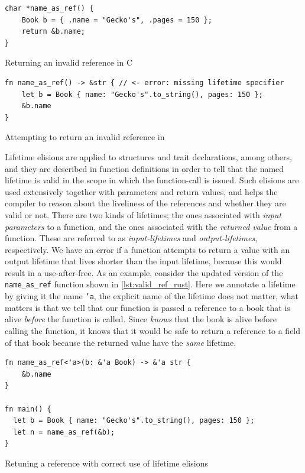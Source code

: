 \begin{listing}[tb]
\begin{verbatim}
char *name_as_ref() {
    Book b = { .name = "Gecko's", .pages = 150 };
    return &b.name;
}
\end{verbatim}
\caption{Returning an invalid reference in C}
\label{lst:invalid_ref_c}
\end{listing}

\begin{listing}[tb]
\begin{verbatim}
fn name_as_ref() -> &str { // <- error: missing lifetime specifier
    let b = Book { name: "Gecko's".to_string(), pages: 150 };
    &b.name
}
\end{verbatim}
\caption{Attempting to return an invalid reference in \rust}
\label{lst:invalid_ref_rust}
\end{listing}

Lifetime elisions are applied to structures and trait declarations, among others, and they are described in function definitions in order to tell \rust that the named lifetime is valid in the scope in which the function-call is issued.
Such elisions are used extensively together with parameters and return values, and helps the compiler to reason about the liveliness of the references and whether they are valid or not.
There are two kinds of lifetimes; the ones associated with \emph{input parameters} to a function, and the ones associated with the \emph{returned value} from a function.
These are referred to as \emph{input-lifetimes} and \emph{output-lifetimes}, respectively.
We have an error if a function attempts to return a value with an output lifetime that lives shorter than the input lifetime, because this would result in a use-after-free.
As an example, consider the updated version of the \texttt{name\_as\_ref} function shown in \autoref{lst:valid_ref_rust}.
Here we annotate a lifetime by giving it the name \texttt{'a}, the explicit name of the lifetime does not matter, what matters is that we tell \rust that our function is passed a reference to a book that is alive \emph{before} the function is called.
Since \rust \emph{knows} that the book is alive before calling the function, it knows that it would be safe to return a reference to a field of that book because the returned value have the \emph{same} lifetime.

\begin{listing}[tb]
\begin{verbatim}
fn name_as_ref<'a>(b: &'a Book) -> &'a str {
    &b.name
}

fn main() {
  let b = Book { name: "Gecko's".to_string(), pages: 150 };
  let n = name_as_ref(&b);
}
\end{verbatim}
\caption{Retuning a reference with correct use of lifetime elisions}
\label{lst:valid_ref_rust}
\end{listing}

